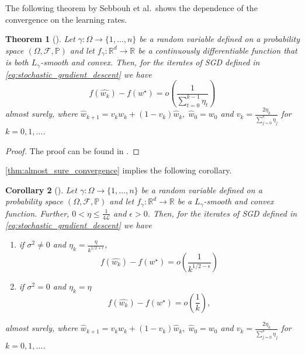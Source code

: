 \documentclass[12pt]{article}
\newtheorem{theorem}{Theorem}[section]
\newtheorem{corollary}[theorem]{Corollary}
\theoremstyle{definition}
\numberwithin{equation}{section}
\newcommand{\R}{\mathbb{R}}
\newcommand{\BP}{\mathbb{P}}
\newcommand{\CF}{\mathcal{F}}
\newcommand{\CL}{\mathcal{L}}
\begin{document}
The following theorem by Sebbouh et al.\ shows the dependence of the convergence on the learning rates.
\begin{theorem}[]
  \label{thm:almost_sure_convergence}
  Let $\gamma : \Omega \rightarrow \{1,\dots,n\}$ be a random variable defined on a probability space $(\Omega, \CF, \BP)$ and let $f_{\gamma} : \R^d \rightarrow \R$ be a continuously differentiable function that is both $L_{\gamma}$-smooth and convex. Then, for the iterates of SGD defined in \eqref{eq:stochastic_gradient_descent} we have 
  \begin{equation*}
    f(\widehat{w_{k}}) - f(w^\star) = o\left(\frac{1}{\sum_{t=0}^{k-1}\eta_t}\right)
  \end{equation*}
  almost surely, where $\widehat{w}_{k+1} = v_k w_k + (1-v_k)\widehat{w}_k, \; \widehat{w}_0 = w_0$ and $v_k = \frac{2\eta_k}{\sum_{j=0}^k\eta_j}$ for $k=0,1,\dots$.
\end{theorem}
\begin{proof}
  The proof can be found in \autocite{sebbouhAlmostSureConvergence2021}.
\end{proof}
\autoref{thm:almost_sure_convergence} implies the following corollary.
\begin{corollary}[]
  \label{cor:sgd_convergence}
  Let $\gamma : \Omega \rightarrow \{1,\dots,n\}$ be a random variable defined on a probability space $(\Omega, \CF, \BP)$ and let $f_{\gamma}: \R^d \rightarrow \R$ be a $L_\gamma$-smooth and convex function. Further, $0 < \eta \leq \frac{1}{4\CL}$ and $\epsilon > 0 $. Then, for the iterates of SGD defined in \eqref{eq:stochastic_gradient_descent} we have 
  \begin{enumerate}[label=(\roman*)]
    \item if $\sigma^2 \neq 0$ and $\eta_k = \frac{\eta}{k^{1/2+\epsilon}}$,
    \begin{equation*}
      f(\widehat{w_{k}}) - f(w^\star) = o\left(\frac{1}{k^{1/2-\epsilon}}\right)
    \end{equation*}
    \item if $\sigma^2 = 0$ and $\eta_k = \eta$
    \begin{equation*}
      f(\widehat{w_{k}}) - f(w^\star) = o\left(\frac{1}{k}\right),
    \end{equation*}
  \end{enumerate}
  almost surely, where $\widehat{w}_{k+1} = v_k w_k + (1-v_k)\widehat{w}_k, \; \widehat{w}_0 = w_0$ and $v_k = \frac{2\eta_k}{\sum_{j=0}^k\eta_j}$ for $k=0,1,\dots$.
\end{corollary}
\end{document}
